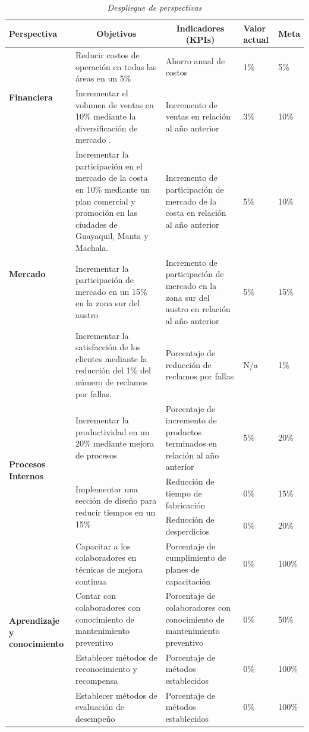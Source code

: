 \documentclass[12pt, a4paper]{article}
\begin{document}
\begin{table}[H]
\centering
\caption{\textit{{Despliegue de perspectivas}}}
\label{tabla:3}
\begin{tabular}{|p{2.5cm}|p{4.9cm}|p{4.6cm}|p{1cm}|p{1cm}|}
\hline
\textbf{Perspectiva} & \multicolumn{1}{c|}{\textbf{Objetivos}} & \multicolumn{1}{c|}{\textbf{Indicadores (KPIs)}} & \textbf{Valor actual} & \textbf{Meta} \\ \hline
\multirow{2}{2cm}{\textbf{Financiera}} & Reducir  costos de operación en todas las áreas en un 5\% & Ahorro anual de costos & 1\% & 5\% \\ \cline{2-5} 
 & Incrementar el volumen de ventas en  10\% mediante la diversificación de mercado . & Incremento de ventas en relación al año anterior & 3\% & 10\% \\ \hline
\multirow{3}{5cm}{\textbf{Mercado}} & Incrementar la participación en el mercado de la costa en  10\% mediante  un plan comercial y  promoción  en las ciudades de Guayaquil, Manta y Machala. & Incremento de participación de mercado de la costa en relación al año anterior & 5\% & 10\% \\ \cline{2-5} 
 & Incrementar la participación de mercado en un 15\% en la zona sur del austro  & Incremento de participación de mercado en la zona sur del austro en relación al año anterior & 5\% & 15\% \\ \cline{2-5} 
 & Incrementar la satisfacción de los clientes mediante la reducción del 1\% del número de reclamos por fallas. & Porcentaje de reducción de reclamos por fallas & N/a & 1\% \\ \hline
\multirow{3}{3cm}{\textbf{Procesos Internos}} & Incrementar la productividad en un 20\% mediante mejora de procesos & Porcentaje de incremento de productos terminados en relación al año anterior & 5\% & 20\% \\ \cline{2-5} 
 & \multirow{2}{4.7cm}{Implementar una sección de diseño para reducir tiempos en un 15\% } & Reducción de tiempo de fabricación & 0\% & 15\% \\ \cline{3-5} 
 &  & Reducción de desperdicios & 0\% & 20\% \\ \hline
\multirow{4}{2.2cm}{\textbf{Aprendizaje y conocimiento}} & Capacitar a los colaboradores en técnicas de mejora continua & Porcentaje de cumplimiento de planes de capacitación & 0\% & 100\% \\ \cline{2-5} 
 & Contar con colaboradores con conocimiento de mantenimiento preventivo & Porcentaje de colaboradores con conocimiento de mantenimiento preventivo & 0\% & 50\% \\ \cline{2-5} 
 & Establecer métodos de reconocimiento y recompensa  & Porcentaje de métodos establecidos & 0\% & 100\% \\ \cline{2-5} 
 & Establecer métodos de evaluación de desempeño & Porcentaje de métodos establecidos & 0\% & 100\% \\ \hline
\end{tabular}
\end{table}
	
\end{document}
